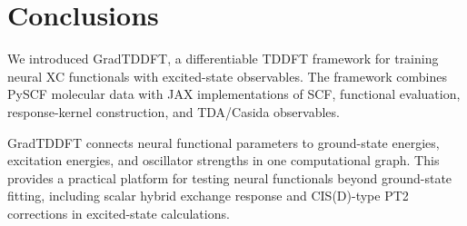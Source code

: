\section{Conclusions}
\label{sec:conclusions}

We introduced GradTDDFT, a differentiable TDDFT framework for
training neural XC functionals with excited-state observables. The
framework combines PySCF molecular data with JAX
implementations of SCF, functional evaluation, response-kernel
construction, and TDA/Casida observables.

GradTDDFT connects neural functional parameters to ground-state
energies, excitation energies, and oscillator strengths in one
computational graph. This
provides a practical platform for testing neural functionals beyond
ground-state fitting, including scalar hybrid exchange response and
CIS(D)-type PT2 corrections in excited-state calculations.
